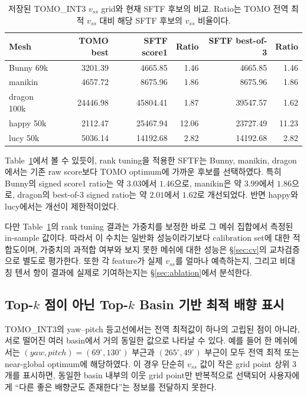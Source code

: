 \documentclass[11pt,a4paper]{article}
\begin{document}
\begin{table}[H]
\centering
\caption{저장된 TOMO\_INT3 $v_{ss}$ grid와 현재 SFTF 후보의 비교.
Ratio는 TOMO 전역 최적 $v_{ss}$ 대비 해당 SFTF 후보의 $v_{ss}$ 비율이다.}
\label{tab:sftf-tomo-comparison}
\begin{tabular}{lrrrrr}
\toprule
Mesh & TOMO best & SFTF score1 & Ratio & SFTF best-of-3 & Ratio\\
\midrule
Bunny 69k & 3201.39 & 4665.85 & 1.46 & 4665.85 & 1.46\\
manikin & 4657.72 & 8675.96 & 1.86 & 8675.96 & 1.86\\
dragon 100k & 24446.98 & 45804.41 & 1.87 & 39547.57 & 1.62\\
happy 50k & 2112.47 & 25467.94 & 12.06 & 23727.49 & 11.23\\
lucy 50k & 5036.14 & 14192.68 & 2.82 & 14192.68 & 2.82\\
\bottomrule
\end{tabular}
\end{table}

Table~\ref{tab:sftf-tomo-comparison}에서 볼 수 있듯이,
rank tuning을 적용한 SFTF는 Bunny, manikin, dragon에서는 기존 raw score보다 TOMO optimum에 가까운 후보를 선택하였다.
특히 Bunny의 signed score1 ratio는 약 $3.03$에서 $1.46$으로,
manikin은 약 $3.99$에서 $1.86$으로,
dragon의 best-of-3 signed ratio는 약 $2.01$에서 $1.62$로 개선되었다.
반면 happy와 lucy에서는 개선이 제한적이었다.

다만 Table~\ref{tab:sftf-tomo-comparison}의 rank tuning 결과는 가중치를 보정한 바로 그 메쉬 집합에서 측정된 in-sample 값이다.
따라서 이 수치는 일반화 성능이라기보다 calibration set에 대한 적합도이며,
가중치의 과적합 여부와 보지 못한 메쉬에 대한 성능은 \S\ref{sec:cv}의 교차검증으로 별도로 평가한다.
또한 각 feature가 실제 $v_{ss}$를 얼마나 예측하는지, 그리고 비대칭 텐서 항이 결과에 실제로 기여하는지는 \S\ref{sec:ablation}에서 분석한다.

\subsection{Top-$k$ 점이 아닌 Top-$k$ Basin 기반 최적 배향 표시}

TOMO\_INT3의 yaw--pitch 등고선에서는 전역 최적값이 하나의 고립된 점이 아니라,
서로 떨어진 여러 basin에서 거의 동일한 값으로 나타날 수 있다.
예를 들어 한 메쉬에서는 $(yaw,pitch)=(69^\circ,130^\circ)$ 부근과
$(265^\circ,49^\circ)$ 부근이 모두 전역 최적 또는 near-global optimum에 해당하였다.
이 경우 단순히 $v_{ss}$ 값이 작은 grid point 상위 3개를 표시하면,
동일한 basin 내부의 이웃 grid point만 반복적으로 선택되어
사용자에게 ``다른 좋은 배향군도 존재한다''는 정보를 전달하지 못한다.
\end{document}
